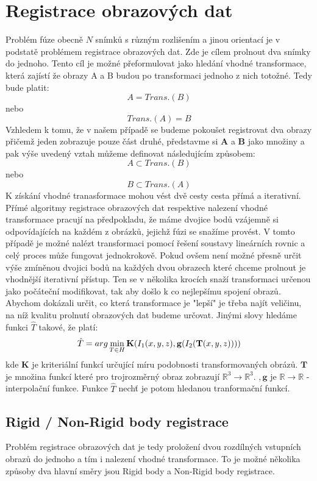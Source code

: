 \documentclass{thesis}%
\begin{document}
\chapter{Registrace obrazových dat}
Problém fúze obecně $N$ snímků s různým rozlišením a jinou orientací je v podstatě problémem registrace obrazových dat. Zde je cílem prolnout dva snímky do jednoho. Tento cíl je možné přeformulovat jako hledání vhodné transformace, která zajístí že obrazy A a B budou po transformaci jednoho z nich totožné. Tedy bude platit:\\
 $$A = Trans.(B) $$
nebo
$$ Trans.(A) = B$$
Vzhledem k tomu, že v našem případě se budeme pokoušet registrovat dva obrazy přičemž jeden zobrazuje pouze část druhé, představme si \textbf{A} a \textbf{B} jako množiny a pak výše uvedený vztah můžeme definovat následujícím způsobem:
$$A \subset Trans.(B)$$
nebo 
$$B \subset Trans.(A)$$
K získání vhodné tranasformace mohou vést dvě cesty cesta přímá a iterativní. Přímé algoritmy registrace obrazových dat respektive nalezení vhodné transformace pracují na předpokladu, že máme dvojice bodů vzájemně si odpovídajících na každém z obrázků, jejichž fúzi se snažíme provést. V tomto případě je možné nalézt transformaci pomocí řešení soustavy lineárních rovnic a celý proces může fungovat jednokrokově. Pokud ovšem není možné přesně určit výše zmíněnou dvojici bodů na každých dvou obrazech které chceme prolnout je vhodnější iterativní přístup. Ten se v několika krocích snaží transformaci určenou jako počáteční modifikovat, tak aby došlo k co nejlepšímu spojení obrazů. \\
Abychom dokázali určit, co která transformace je "lepší" je třeba najít veličinu, na níž kvalitu prolnutí obrazových dat budeme určovat. Jinými slovy hledáme funkci $\hat{T}$ takové, že platí:
\begin{equation}
 \centering
	\hat{T} = arg \min_{T \in H}\mathbf{K}(I_{1}(x,y,z),\mathbf{g}(I_{2}(\mathbf{T}(x,y,z)))) 
\end{equation}
kde $\mathbf{K}$ je kriteriální funkcí určující míru podobnosti transformovaných obrázů. $\mathbf{T}$ je množina funkcí které pro trojrozměrný obraz zobrazují $\mathbb{R}^{3}\rightarrow\mathbb{R}^{3}$. $,\mathbf{g}$ je $\mathbb{R}\rightarrow\mathbb{R}$ - interpolační funkce. Funkce $\hat{T}$ nechť je potom hledanou tranformační funkcí.\\

\section{Rigid / Non-Rigid body registrace}
Problém registrace obrazových dat je tedy proložení dvou rozdílných vstupních obrazů do jednoho a tím i nalezení vhodné transformace. To je možné několika způsoby dva hlavní směry jsou Rigid body a Non-Rigid body registrace.
\end{document}
